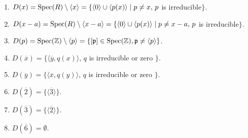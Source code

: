 \documentclass[Notebook.tex]{subfiles}
\begin{document}
\begin{solution}
    \bbni
    \begin{enumerate}
        \item $D(x) = \operatorname{Spec}(R) \setminus \langle x \rangle = \{\langle 0 \rangle \cup \langle p(x) \rangle \mid p \neq x, \,p$ is irreducible$\}$. 
        \item $D(x-a) = \operatorname{Spec}(R) \setminus \langle x - a \rangle = \{\langle 0 \rangle \cup \langle p(x) \rangle \mid p \neq x -a , \,p$ is irreducible$\}$. 
        \item $D(p) = \operatorname{Spec}(\mathbb Z) \setminus \langle p \rangle = \{[\operatorname{\mathfrak{p}}] \in \operatorname{Spec}(\mathbb Z), \operatorname{\mathfrak{p}} \neq \langle p \rangle \}$.
        \item $D(\overline x) = \{\langle \overline y, q(x) \rangle, \,q$ is irreducible or zero $\}$.
        \item $D(\overline y) = \{\langle \overline x, q(y) \rangle, \,q$ is irreducible or zero $\}$.
        \item $D(\overline 2) = \{\langle \overline 3 \rangle \}$.
        \item $D(\overline 3) = \{\langle \overline 2 \rangle \}$.
        \item $D(\overline 6) = \emptyset$.
    \end{enumerate}
\end{solution}

\newpage
\end{document}

